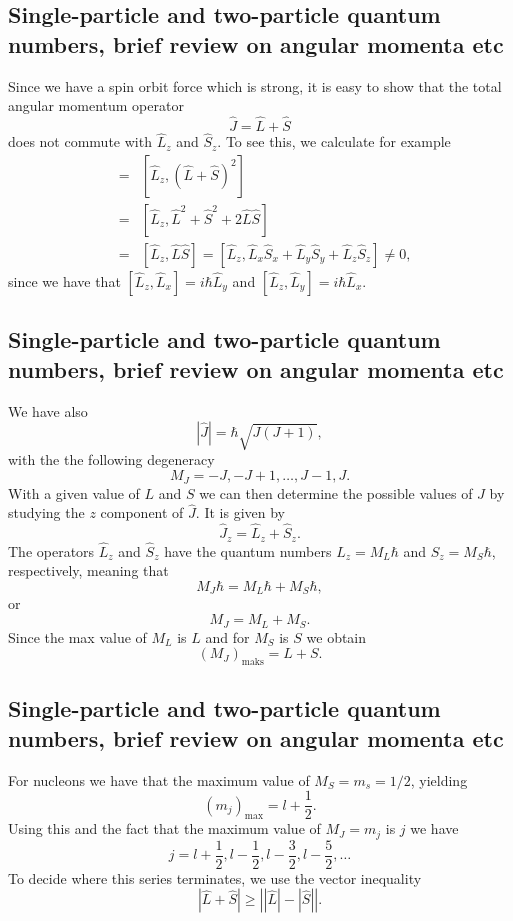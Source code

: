 \documentclass[%
twoside,                 %
final,                   %
10pt]{article}
\begin{document}
\subsection{Single-particle and two-particle quantum numbers, brief review on angular momenta etc}
\begin{block}{}
Since we have a spin orbit force which is strong, it is easy to show that 
the total angular momentum operator
\[
   \hat{J}=\hat{L}+\hat{S}
\]
does not commute with $\hat{L}_z$ and $\hat{S}_z$. To see this, we calculate for example
\begin{eqnarray} 
   [\hat{L}_z,\hat{J}^2]&=&[\hat{L}_z,(\hat{L}+\hat{S})^2] \\ \nonumber
   &=&[\hat{L}_z,\hat{L}^2+\hat{S}^2+2\hat{L}\hat{S}]\\ \nonumber 
   &=& [\hat{L}_z,\hat{L}\hat{S}]=[\hat{L}_z,\hat{L}_x\hat{S}_x+\hat{L}_y\hat{S}_y+\hat{L}_z\hat{S}_z]\ne 0, 
\end{eqnarray}
since we have that $[\hat{L}_z,\hat{L}_x]=i\hbar\hat{L}_y$ and $[\hat{L}_z,\hat{L}_y]=i\hbar\hat{L}_x$. 
\end{block}

\subsection{Single-particle and two-particle quantum numbers, brief review on angular momenta etc}
\begin{block}{}
We have also
\[
   |\hat{J}|=\hbar\sqrt{J(J+1)},
\]
with the the following degeneracy
\[
   M_J=-J, -J+1, \dots, J-1, J.
\]
With a given value of  $L$ and $S$ we can then determine the possible values of 
 $J$ by studying the $z$ component of  $\hat{J}$. 
It is given by
\[
\hat{J}_z=\hat{L}_z+\hat{S}_z.
\]
The operators $\hat{L}_z$ and $\hat{S}_z$ have the quantum numbers
$L_z=M_L\hbar$ and $S_z=M_S\hbar$, respectively, meaning that
\[
   M_J\hbar=M_L\hbar +M_S\hbar,
\]
or
\[
   M_J=M_L +M_S.
\]
Since the max value of  $M_L$ is $L$ and for  $M_S$ is $S$
we obtain
\[
   (M_J)_{\mathrm{maks}}=L+S.
\]
\end{block}

\subsection{Single-particle and two-particle quantum numbers, brief review on angular momenta etc}
\begin{block}{}
For nucleons we have that the maximum value of $M_S=m_s=1/2$, yielding
\[
   (m_j)_{\mathrm{max}}=l+\frac{1}{2}.
\]
Using this and the fact that the maximum value of  $M_J=m_j$ is $j$ we have
\[
   j=l+\frac{1}{2}, l-\frac{1}{2}, l-\frac{3}{2}, l-\frac{5}{2}, \dots 
\]
To decide where this series terminates, we use the vector inequality
\[
   |\hat{L}+\hat{S}| \ge \left| |\hat{L}|-|\hat{S}|\right|.
\]
\end{block}
\end{document}
